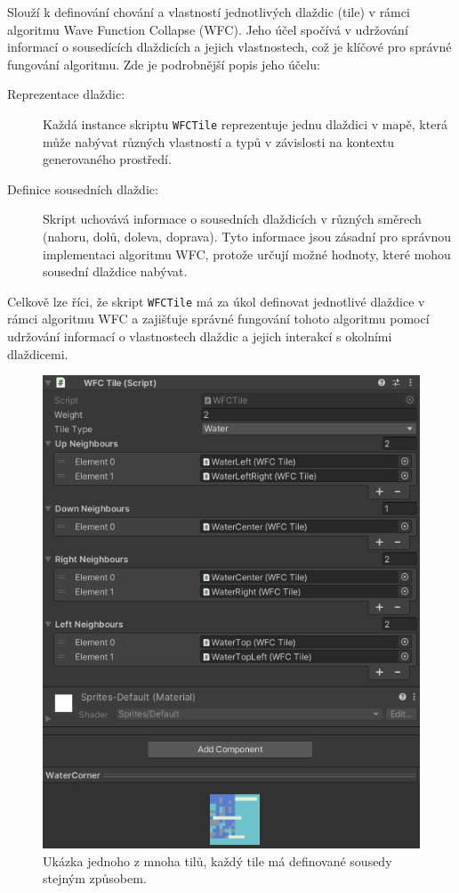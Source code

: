 Slouží k definování chování a vlastností jednotlivých dlaždic (tile) v rámci algoritmu Wave Function Collapse (WFC). Jeho účel spočívá v udržování informací o sousedících dlaždicích a jejich vlastnostech, což je klíčové pro správné fungování algoritmu. Zde je podrobnější popis jeho účelu:

\begin{description}
	\item [Reprezentace dlaždic:] Každá instance skriptu \texttt{WFCTile} reprezentuje jednu dlaždici v mapě, která může nabývat různých vlastností a typů v závislosti na kontextu generovaného prostředí.
	
	\item [Definice sousedních dlaždic:] Skript uchovává informace o sousedních dlaždicích v různých směrech (nahoru, dolů, doleva, doprava). Tyto informace jsou zásadní pro správnou implementaci algoritmu WFC, protože určují možné hodnoty, které mohou sousední dlaždice nabývat.
\end{description}

Celkově lze říci, že skript \texttt{WFCTile} má za úkol definovat jednotlivé dlaždice v rámci algoritmu WFC a zajišťuje správné fungování tohoto algoritmu pomocí udržování informací o vlastnostech dlaždic a jejich interakcí s okolními dlaždicemi.

\begin{figure}[H]
	\centering
	\includegraphics[scale=1]{obrazky-figures/WFCTile.png}
	\caption{Ukázka jednoho z mnoha tilů, každý tile má definované sousedy stejným způsobem.}
	\label{fig:WFCTile}
\end{figure}

